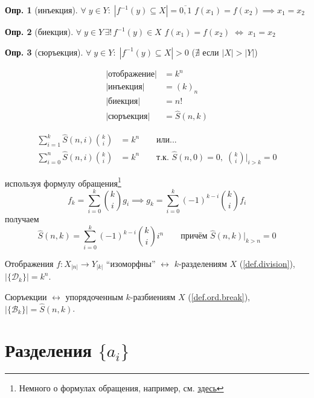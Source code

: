 \documentclass[a4paper,12pt]{article}
\numberwithin{figure}{section}
\theoremstyle{definition}
\newtheorem{definition}{Опр.}[section]
\theoremstyle{definition}
\def\iiff{$\;\Longleftrightarrow\;$}
\begin{document}
\begin{definition}[инъекция]
	$\forall \; y \in Y: \; |f^{-1}(y) \subseteq X| = \overline{0,1}$
	\qquad  $f(x_1) = f(x_2) \implies x_1 = x_2$
\end{definition}

\begin{definition}[биекция]
	$\forall \; y \in Y \, \exists ! \, f^{-1}(y) \in X$
	\qquad  $f(x_1) = f(x_2) $\iiff$ x_1 = x_2$
\end{definition}

\begin{definition}[сюръекция]
	$\forall \; y \in Y: \; |f^{-1}(y) \subseteq X| > 0$
	\qquad ($\nexists$ если $|X|>|Y|$)
\end{definition}

\begin{align*}
	|\text{отображение}| &= k^n \\
	|\text{инъекция}| &= (k)_n \\
	|\text{биекция}| &= n! \\
	|\text{сюръекция}| &= \hat{S}(n,k)
\end{align*}

\begin{align*}
	\sum_{i=1}^k{ \hat{S}(n,i) \binom{k}{i} } &= k^n   \qquad \text{или...}  \\
   	\sum_{i=0}^n{ \hat{S}(n,i) \binom{k}{i} } &= k^n
   	\qquad \text{т.к. } \hat{S}(n,0)=0, \; \binom{k}{i}\biggr|_{i>k}=0
\end{align*}

используя формулу обращения\footnote{Немного о формулах обращения, например, см. \href{http://iskhacov.narod.ru/materials/combinators.pdf}{здесь}}
\[ f_k = \sum_{i=0}^k{ \binom{k}{i} g_i } \implies
   g_k = \sum_{i=0}^k{ (-1)^{k-i} \binom{k}{i} f_i } \]
получаем
\[ \hat{S}(n,k) = \sum_{i=0}^k{ (-1)^{k-i} \binom{k}{i} i^n }
   \qquad \text{причём } \hat{S}(n,k)\bigr|_{k>n}=0 \]

Отображения $f: X_{|n|} \rightarrow Y_{|k|}$ ``изоморфны'' $\longleftrightarrow$ $k$-разделениям $X$ (\ref{def.division}), $|\{\mathcal{D}_k\}|=k^n$.

Сюръекции $\longleftrightarrow$ упорядоченным $k$-разбиениям $X$ (\ref{def.ord.break}), $|\{\mathcal{B}_k\}|=\hat{S}(n,k)$.



\section{Разделения $\{a_i\}$}
\end{document}
